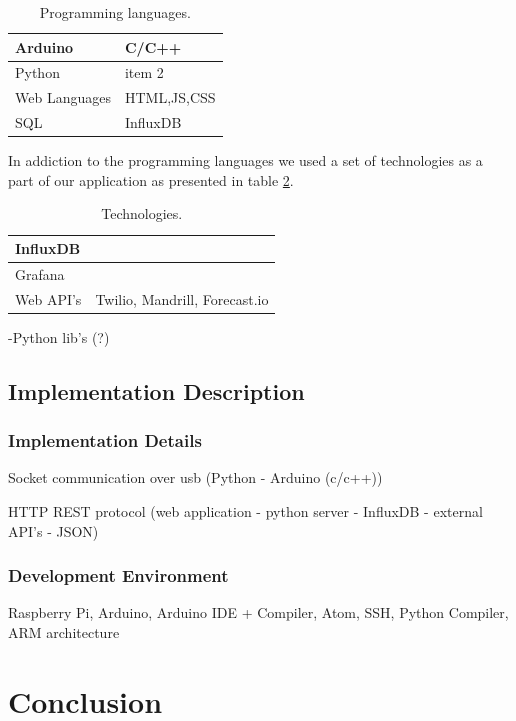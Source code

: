 \documentclass[12pt]{article}
\begin{document}
\begin{table}[H]
\begin{tabularx}{0.8\textwidth}{ |l|X| }
  	\hline
  	Arduino  & C/C++  \\
 	\hline
 	Python  & item 2   \\
  	\hline
 	Web Languages  & HTML,JS,CSS   \\
	\hline
	SQL  & InfluxDB   \\
	\hline
\end{tabularx}
	\caption{Programming languages.}
  	\label{tab:prolangs}
\end{table}

In addiction to the programming languages we used a set of technologies as a part of our application as presented in table \ref{tab:tech}.

\begin{table}[H]
\begin{tabularx}{0.8\textwidth}{ |l|X| }
  	\hline
  	InfluxDB  &   \\
 	\hline
 	Grafana  &   \\
  	\hline
 	Web API's & Twilio, Mandrill, Forecast.io   \\
	\hline
\end{tabularx}
	\caption{Technologies.}
  	\label{tab:tech}
\end{table}

-Python lib's (?)

\subsection{Implementation Description}

\subsubsection{Implementation Details}

Socket communication over usb (Python - Arduino (c/c++))

HTTP REST protocol  (web application - python server - InfluxDB - external API's - JSON)

\subsubsection{Development Environment}

Raspberry Pi, Arduino, Arduino IDE  + Compiler, Atom, SSH, Python Compiler, ARM architecture 

\newpage
\section{Conclusion}
\end{document}
